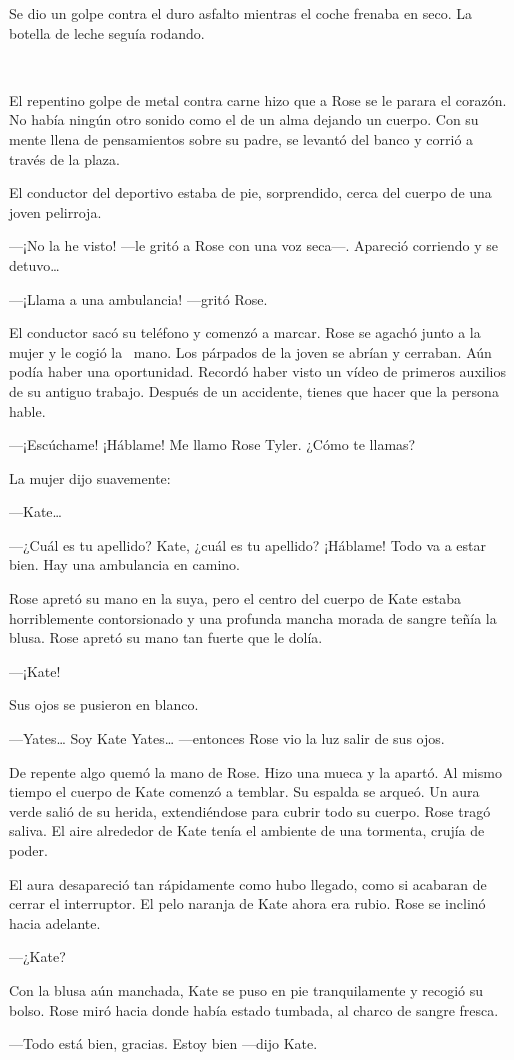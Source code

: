 Se dio un golpe contra el duro asfalto mientras el coche frenaba en
seco. La botella de leche seguía rodando.

~

El repentino golpe de metal contra carne hizo que a Rose se le parara el
corazón. No había ningún otro sonido como el de un alma dejando un
cuerpo. Con su mente llena de pensamientos sobre su padre, se levantó
del banco y corrió a través de la plaza.

El conductor del deportivo estaba de pie, sorprendido, cerca del cuerpo
de una joven pelirroja.

---¡No la he visto! ---le gritó a Rose con una voz seca---. Apareció
corriendo y se detuvo\ldots{}

---¡Llama a una ambulancia! ---gritó Rose.

El conductor sacó su teléfono y comenzó a marcar. Rose se agachó junto a
la mujer y le cogió la ~mano. Los párpados de la joven se abrían y
cerraban. Aún podía haber una oportunidad. Recordó haber visto un vídeo
de primeros auxilios de su antiguo trabajo. Después de un accidente,
tienes que hacer que la persona hable.

---¡Escúchame! ¡Háblame! Me llamo Rose Tyler. ¿Cómo te llamas?

La mujer dijo suavemente:

---Kate\ldots{}

---¿Cuál es tu apellido? Kate, ¿cuál es tu apellido? ¡Háblame! Todo va
a estar bien. Hay una ambulancia en camino.

Rose apretó su mano en la suya, pero el centro del cuerpo de Kate estaba
horriblemente contorsionado y una profunda mancha morada de sangre teñía
la blusa. Rose apretó su mano tan fuerte que le dolía.

---¡Kate!

Sus ojos se pusieron en blanco.

---Yates\ldots{} Soy Kate Yates\ldots{} ---entonces Rose vio la luz salir
de sus ojos.

De repente algo quemó la mano de Rose. Hizo una mueca y la apartó. Al
mismo tiempo el cuerpo de Kate comenzó a temblar. Su espalda se arqueó.
Un aura verde salió de su herida, extendiéndose para cubrir todo su
cuerpo. Rose tragó saliva. El aire alrededor de Kate tenía el ambiente
de una tormenta, crujía de poder.

El aura desapareció tan rápidamente como hubo llegado, como si acabaran
de cerrar el interruptor. El pelo naranja de Kate ahora era rubio. Rose
se inclinó hacia adelante.

---¿Kate?

Con la blusa aún manchada, Kate se puso en pie tranquilamente y recogió
su bolso. Rose miró hacia donde había estado tumbada, al charco de
sangre fresca.

---Todo está bien, gracias. Estoy bien ---dijo Kate.